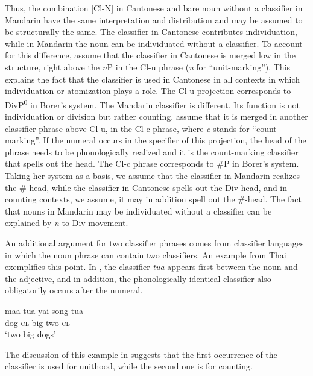 \documentclass[output=paper,colorlinks,citecolor=brown]{langscibook}
\begin{document}
\noindent Thus, the combination [Cl-N] in Cantonese and bare noun without a classifier in Mandarin have the same interpretation and distribution and may be assumed to be structurally the same. The classifier in Cantonese contributes individuation, while in Mandarin the noun can be individuated without a classifier. To account for this difference, \citet{ChengSybesma2014} assume that the classifier in Cantonese is merged low in the structure, right above the \textit{n}P in the Cl-u phrase (\textit{u} for ``unit-marking''). This explains the fact that the classifier is used in Cantonese in all contexts in which individuation or atomization plays a role. The Cl-u projection corresponds to DivP\textsuperscript{0} in Borer's system. The Mandarin classifier is different. Its function is not individuation or division but rather counting. \citeauthor{ChengSybesma2014} %
assume that it is merged in another classifier phrase above Cl-u, in the Cl-c phrase, where \textit{c} stands for ``count-marking''. If the numeral occurs in the specifier of this projection, the head of the phrase needs to be phonologically realized and it is the count-marking classifier that spells out the head. The Cl-c phrase corresponds to \#P in Borer's system. Taking her system as a basis, we assume that the classifier in Mandarin realizes the \#-head, while the classifier in Cantonese spells out the Div-head, and in counting contexts, we assume, it may in addition spell out the \#-head. The fact that nouns in Mandarin may be individuated without a classifier can be explained by \textit{n}-to-Div movement. 

An additional argument for two classifier phrases comes from classifier languages in which the noun phrase can contain two classifiers. An example from Thai exemplifies this point. In , the classifier \textit{tua} appears first between the noun and the adjective, and in addition, the phonologically identical classifier also obligatorily occurs after the numeral.

\ea\label{ex:geist:5}
\gll maa tua yai song tua \\
dog \textsc{cl}	big two \textsc{cl} \\ 
\glt `two big dogs' \hfill \citep[Thai;][261]{ChengSybesma2014}
\z

\noindent The discussion of this example in \citet[261]{ChengSybesma2014} suggests that the first occurrence of the classifier is used for unithood, while the second one is for counting. 
\end{document}
